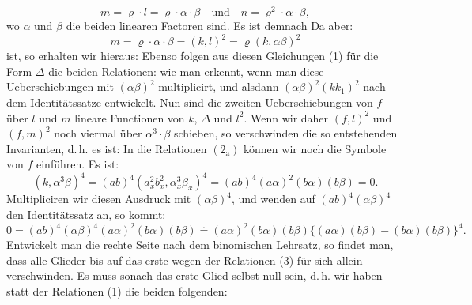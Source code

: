 \[
m=\varrho\cdot l=\varrho\cdot\alpha\cdot\beta\quad\text{und}\quad n=\varrho^2\cdot\alpha\cdot\beta,
\]
wo $\alpha$ und $\beta$ die beiden linearen Factoren sind. Es ist demnach
Da aber:
\[
m=\varrho\cdot\alpha\cdot\beta=(k,l)^2=\varrho(k,\alpha\beta)^2
\]
ist, so erhalten wir hieraus:
Ebenso folgen aus diesen Gleichungen (1) für die Form $\varDelta$ die beiden Relationen:
wie man erkennt, wenn man diese Ueberschiebungen mit $(\alpha\beta)^2$ multiplicirt, und alsdann $(\alpha\beta)^2(kk_1)^2$ nach dem Identitätssatze entwickelt.
Nun sind die zweiten Ueberschiebungen von $f$ über $l$ und $m$ lineare Functionen von $k$, $\varDelta$ und $l^2$. Wenn wir daher $(f,l)^2$ und $(f,m)^2$ noch viermal über $\alpha^3\cdot\beta$ schieben, so verschwinden die so entstehenden Invarianten, d.\,h. es ist:
In die Relationen $(2_{\mathrm{a}})$ können wir noch die Symbole von $f$ einführen. Es ist:
\[
(k,\alpha^3\beta)^4=(ab)^4(a_x^2b_x^2,\alpha_x^3\beta_x)^4=(ab)^4(a\alpha)^2(b\alpha)(b\beta)=0.
\]
Multipliciren wir diesen Ausdruck mit $(\alpha\beta)^4$, und wenden auf $(ab)^4(\alpha\beta)^4$ den Identitätssatz an, so kommt:
\[
0=(ab)^4(\alpha\beta)^4(a\alpha)^2(b\alpha)(b\beta)\doteq(a\alpha)^2(b\alpha)(b\beta)\{(a\alpha)(b\beta)-(b\alpha)(b\beta)\}^4.
\]
Entwickelt man die rechte Seite nach dem binomischen Lehrsatz, so findet man, dass alle Glieder bis auf das erste wegen der Relationen (3) für sich allein verschwinden. Es muss sonach das erste Glied selbst null sein, d.\,h. wir haben statt der Relationen (1) die beiden folgenden:
